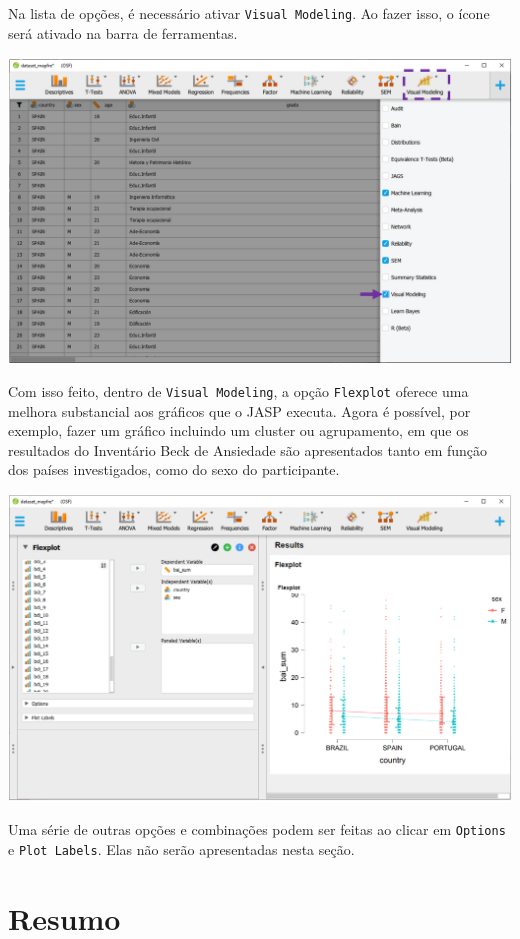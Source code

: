 \documentclass[
]{book}
\begin{document}
Na lista de opções, é necessário ativar \texttt{Visual\ Modeling}. Ao fazer isso, o ícone será ativado na barra de ferramentas.

\includegraphics{./img/cap_desc_jasp_visual_modeling.png}

Com isso feito, dentro de \texttt{Visual\ Modeling}, a opção \texttt{Flexplot} oferece uma melhora substancial aos gráficos que o JASP executa. Agora é possível, por exemplo, fazer um gráfico incluindo um cluster ou agrupamento, em que os resultados do Inventário Beck de Ansiedade são apresentados tanto em função dos países investigados, como do sexo do participante.

\includegraphics{./img/cap_desc_jasp_flexplot.png}

Uma série de outras opções e combinações podem ser feitas ao clicar em \texttt{Options} e \texttt{Plot\ Labels}. Elas não serão apresentadas nesta seção.

\hypertarget{resumo-2}{%
\section{Resumo}\label{resumo-2}}
\end{document}
